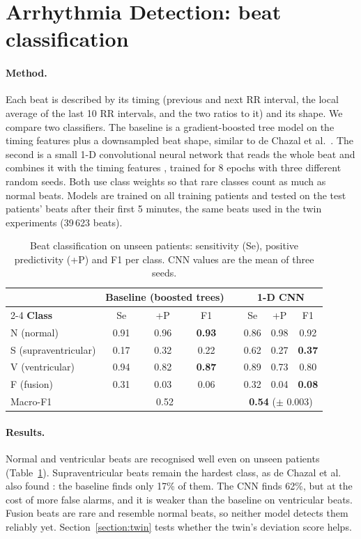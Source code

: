 \section{Arrhythmia Detection: beat classification}
\label{section:detection}

\paragraph{Method.} Each beat is described by its timing (previous and next RR interval, the local average of the last 10 RR intervals, and the two ratios to it) and its shape. We compare two classifiers. The baseline is a gradient-boosted tree model on the timing features plus a downsampled beat shape, similar to de Chazal et al.~\cite{dechazal2004automatic}. The second is a small 1-D convolutional neural network that reads the whole beat and combines it with the timing features \cite{kiranyaz2016realtime}, trained for 8 epochs with three different random seeds. Both use class weights so that rare classes count as much as normal beats. Models are trained on all training patients and tested on the test patients' beats after their first 5 minutes, the same beats used in the twin experiments (39\,623 beats).

\begin{table}[H]
\caption{Beat classification on unseen patients: sensitivity (Se), positive predictivity (+P) and F1 per class. CNN values are the mean of three seeds.}
\label{tab:detection}
\centering
\small
{}
\begin{tabular}{@{}lccccccc@{}}
\toprule
 & \multicolumn{3}{c}{\textbf{Baseline (boosted trees)}} & & \multicolumn{3}{c}{\textbf{1-D CNN}} \\
\cmidrule{2-4} \cmidrule{6-8}
\textbf{Class} & Se & +P & F1 & & Se & +P & F1 \\
\midrule
N (normal) & 0.91 & 0.96 & \textbf{0.93} & & 0.86 & 0.98 & 0.92 \\
S (supraventricular) & 0.17 & 0.32 & 0.22 & & 0.62 & 0.27 & \textbf{0.37} \\
V (ventricular) & 0.94 & 0.82 & \textbf{0.87} & & 0.89 & 0.73 & 0.80 \\
F (fusion) & 0.31 & 0.03 & 0.06 & & 0.32 & 0.04 & \textbf{0.08} \\
\midrule
Macro-F1 & \multicolumn{3}{c}{0.52} & & \multicolumn{3}{c}{\textbf{0.54} ($\pm$ 0.003)} \\
\bottomrule
\end{tabular}
\end{table}

\paragraph{Results.} Normal and ventricular beats are recognised well even on unseen patients (Table~\ref{tab:detection}). Supraventricular beats remain the hardest class, as de Chazal et al. also found \cite{dechazal2004automatic}: the baseline finds only 17\% of them. The CNN finds 62\%, but at the cost of more false alarms, and it is weaker than the baseline on ventricular beats. Fusion beats are rare and resemble normal beats, so neither model detects them reliably yet. Section~\ref{section:twin} tests whether the twin's deviation score helps.
